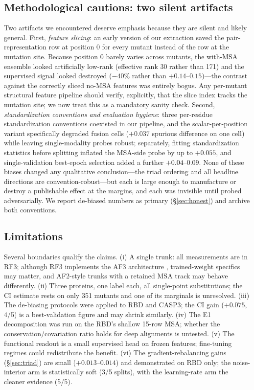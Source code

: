 \documentclass[11pt]{article}
\begin{document}
\subsection{Methodological cautions: two silent artifacts}
\label{sec:caution}

Two artifacts we encountered deserve emphasis because they are silent and
likely general. First, \emph{feature slicing}: an early version of our
extraction saved the pair-representation row at position 0 for every mutant
instead of the row at the mutation site. Because position 0 barely varies
across mutants, the with-MSA ensemble looked artificially low-rank (effective
rank 30 rather than 171) and the supervised signal looked destroyed ($-40\%$
rather than $+0.14$--$0.15$)---the contrast against the correctly sliced
no-MSA features was entirely bogus. Any per-mutant structural feature pipeline
should verify, explicitly, that the slice index tracks the mutation site; we
now treat this as a mandatory sanity check. Second, \emph{standardization
conventions and evaluation hygiene}: three per-residue standardization
conventions coexisted in our pipeline, and the scalar-per-position variant
specifically degraded fusion cells ($+0.037$ spurious difference on one cell)
while leaving single-modality probes robust; separately, fitting
standardization statistics before splitting inflated the MSA-side probe by up
to $+0.055$, and single-validation best-epoch selection added a further
$+0.04$--$0.09$. None of these biases changed any qualitative conclusion---the
triad ordering and all headline directions are convention-robust---but each is
large enough to manufacture or destroy a publishable effect at the margins,
and each was invisible until probed adversarially. We report de-biased numbers
as primary (\S\ref{sec:honest}) and archive both conventions.

\subsection{Limitations}

Several boundaries qualify the claims. (i) A single trunk: all measurements
are in RF3; although RF3 implements the AF3 architecture \cite{corley2025},
trained-weight specifics may matter, and AF2-style trunks with a retained MSA
track may behave differently. (ii) Three proteins, one label each, all
single-point substitutions; the CI estimate rests on only 351 mutants and one
of its marginals is unresolved. (iii) The de-biasing protocols were applied to
RBD and CASP3; the CI gain ($+0.075$, 4/5) is a best-validation figure and may
shrink similarly. (iv) The E1 decomposition was run on the RBD's shallow
15-row MSA; whether the conservation/covariation ratio holds for deep
alignments is untested. (v) The functional readout is a small supervised head
on frozen features; fine-tuning regimes could redistribute the benefit.
(vi) The gradient-rebalancing gains (\S\ref{sec:triad}) are small
($+0.013$--$0.014$) and demonstrated on RBD only; the noise-interior arm is
statistically soft (3/5 splits), with the learning-rate arm the cleaner
evidence (5/5).
\end{document}
